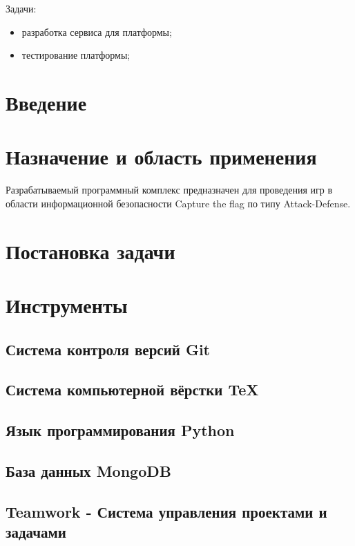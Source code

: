 Задачи:
\begin{itemize}
\item разработка сервиса для платформы;
\item тестирование платформы;
\end{itemize}

 \newpage
 \tableofcontents

 \newpage
 \section*{Введение}
 
 \newpage
 \section{Назначение и область применения}
Разрабатываемый программный комплекс предназначен для проведения игр в области информационной безопасности Capture the flag по типу Attack-Defense.
\section{Постановка задачи}
\setcounter{figure}{0}

\section{Инструменты}
\setcounter{figure}{0}
\subsection{Система контроля версий Git}

\subsection{Система компьютерной вёрстки \TeX}

\subsection{Язык программирования Python}

\subsection{База данных MongoDB}

\subsection{Teamwork - Система управления проектами и задачами}

